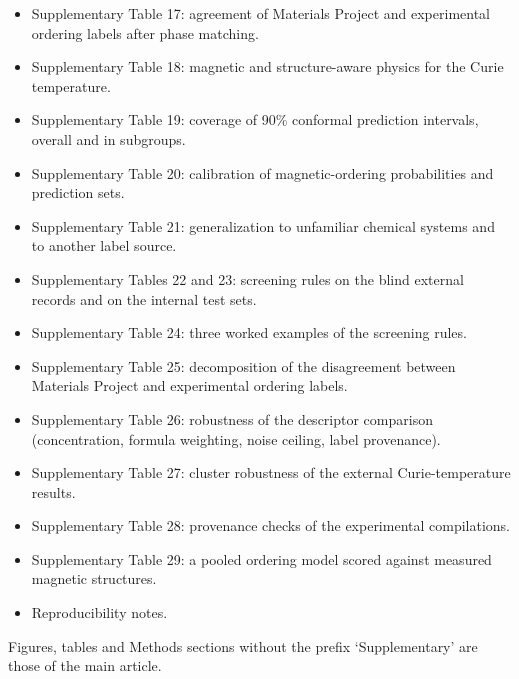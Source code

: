\documentclass[pdflatex,sn-nature]{sn-jnl}
\begin{document}
\begin{itemize}
\item Supplementary Table 17: agreement of Materials Project and experimental ordering labels after phase matching.
\item Supplementary Table 18: magnetic and structure-aware physics for the Curie temperature.
\item Supplementary Table 19: coverage of 90\% conformal prediction intervals, overall and in subgroups.
\item Supplementary Table 20: calibration of magnetic-ordering probabilities and prediction sets.
\item Supplementary Table 21: generalization to unfamiliar chemical systems and to another label source.
\item Supplementary Tables 22 and 23: screening rules on the blind external records and on the internal test sets.
\item Supplementary Table 24: three worked examples of the screening rules.
\item Supplementary Table 25: decomposition of the disagreement between Materials Project and experimental ordering labels.
\item Supplementary Table 26: robustness of the descriptor comparison (concentration, formula weighting, noise ceiling, label provenance).
\item Supplementary Table 27: cluster robustness of the external Curie-temperature results.
\item Supplementary Table 28: provenance checks of the experimental compilations.
\item Supplementary Table 29: a pooled ordering model scored against measured magnetic structures.
\item Reproducibility notes.
\end{itemize}

Figures, tables and Methods sections without the prefix `Supplementary' are those of the main article.
\end{document}
